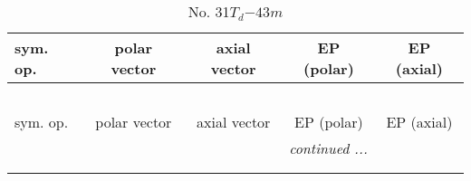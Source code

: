 \documentclass[fleqn,10pt,landscape]{jsarticle}
\begin{document}
\newpage
\begin{center}
\renewcommand{\arraystretch}{1.3}
\begin{longtable}{lcccc}
\caption{No. 31\quad$T_{d}$\quad$-43m$\quad[ cubic ]}
 \\
 \hline \hline
sym. op. & polar vector & axial vector & EP (polar) & EP (axial) \\ \hline \endfirsthead

\multicolumn{4}{l}{\tablename\ \thetable{}} \\
 \hline \hline
sym. op. & polar vector & axial vector & EP (polar) & EP (axial) \\ \hline \endhead

 \hline \hline
\multicolumn{4}{r}{\footnotesize\it continued ...} \\ \endfoot

 \hline \hline
\multicolumn{4}{r}{} \\ \endlastfoot


\end{longtable}
\end{center}
\end{document}
